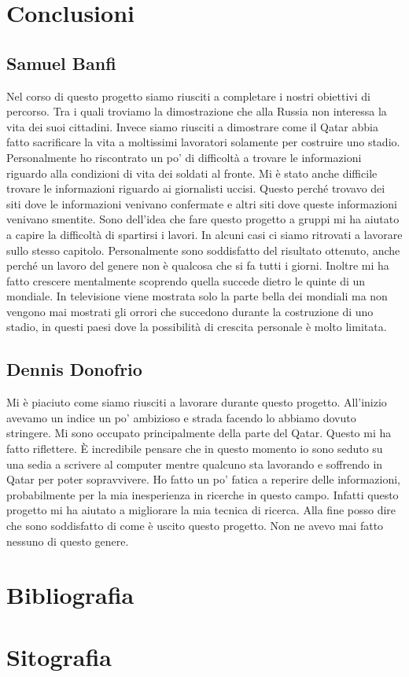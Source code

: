 \documentclass[a4paper, 12pt]{article}
\begin{document}

\pagebreak

\section{Conclusioni}

\subsection{Samuel Banfi}

Nel corso di questo progetto siamo riusciti a completare i nostri obiettivi di percorso. Tra i quali troviamo la dimostrazione che alla Russia non interessa la vita dei suoi cittadini. Invece siamo riusciti a dimostrare come il Qatar abbia fatto sacrificare la vita a moltissimi lavoratori solamente per costruire uno stadio. Personalmente ho riscontrato un po' di difficoltà a trovare le informazioni riguardo alla condizioni di vita dei soldati al fronte. Mi è stato anche difficile trovare le informazioni riguardo ai giornalisti uccisi. Questo perché trovavo dei siti dove le informazioni venivano confermate e altri siti dove queste informazioni venivano smentite. Sono dell'idea che fare questo progetto a gruppi mi ha aiutato a capire la difficoltà di spartirsi i lavori. In alcuni casi ci siamo ritrovati a lavorare sullo stesso capitolo. Personalmente sono soddisfatto del risultato ottenuto, anche perché un lavoro del genere non è qualcosa che si fa tutti i giorni. Inoltre mi ha fatto crescere mentalmente scoprendo quella succede dietro le quinte di un mondiale. In televisione viene mostrata solo la parte bella dei mondiali ma non vengono mai mostrati gli orrori che succedono durante la costruzione di uno stadio, in questi paesi dove la possibilità di crescita personale è molto limitata.

\subsection{Dennis Donofrio}

Mi è piaciuto come siamo riusciti a lavorare durante questo progetto. All'inizio avevamo un indice un po' ambizioso e strada facendo lo abbiamo dovuto stringere. Mi sono occupato principalmente della parte del Qatar. Questo mi ha fatto riflettere. È incredibile pensare che in questo momento io sono seduto su una sedia a scrivere al computer mentre qualcuno sta lavorando e soffrendo in Qatar per poter sopravvivere. Ho fatto un po' fatica a reperire delle informazioni, probabilmente per la mia inesperienza in ricerche in questo campo. Infatti questo progetto mi ha aiutato a migliorare la mia tecnica di ricerca. Alla fine posso dire che sono soddisfatto di come è uscito questo progetto. Non ne avevo mai fatto nessuno di questo genere.

\pagebreak

\section{Bibliografia}

\section{Sitografia}

\nocite{*}
\printbibliography[type=online, heading=subbibliography] 	
\end{document}
